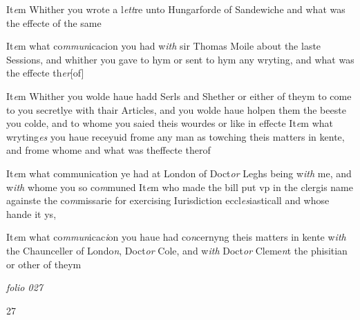 \documentclass[12pt, a4paper]{book}
\begin{document}
				\marginpar[\vspace{0.5cm}{\textcolor{Gray}{n}}]{}
			
		\ifthenelse{\isodd{\thepage}}
		{\reversemarginpar}
		{\normalmarginpar}
		It\textit{e}m Whither you wrote a l\textit{ett}re unto Hungarforde of Sandewiche and what was the effecte of the same 
            	
 	
				\marginpar[\vspace{0.5cm}{\textcolor{Gray}{n}}]{}
			
		\ifthenelse{\isodd{\thepage}}
		{\reversemarginpar}
		{\normalmarginpar}
		It\textit{e}m what co\textit{mmun}icacion you had w\textit{ith} sir Thomas Moile about the laste Sessions, and whither you gave to hym or sent to hym any wryting, and what was the effecte th\textit{er}[of]
 	
		\ifthenelse{\isodd{\thepage}}
		{\reversemarginpar}
		{\normalmarginpar}
		It\textit{e}m Whither you wolde haue hadd Serls and Shether or either of theym to come to you secretlye with thair Articles, and you wolde haue holpen them the beeste you colde, and to whome you saied theis wourdes or like in effecte It\textit{e}m what wryting\textit{es} you haue receyuid frome any man as towching theis matters in kente, and frome whome and what was theffecte therof
 	
		\ifthenelse{\isodd{\thepage}}
		{\reversemarginpar}
		{\normalmarginpar}
		It\textit{e}m what communication ye had at London of Doct\textit{or} Leghs being w\textit{ith} me, and w\textit{ith} whome you so co\textit{m}muned It\textit{e}m who made the bill put vp in the clergis name againste the co\textit{m}missarie for exercising Iurisdiction eccl\textit{es}iasticall and whose hande it ys,
 	
		\ifthenelse{\isodd{\thepage}}
		{\reversemarginpar}
		{\normalmarginpar}
		It\textit{e}m what co\textit{mmun}icac\textit{i}on you haue had co\textit{n}cernyng theis matters in kente w\textit{ith} the Chaunceller of Londo\textit{n}, Doct\textit{or} Cole, and w\textit{ith} Doct\textit{or} Cleme\textit{n}t the phisitian or other of theym

\dotfill
						\newpage
{}

\textit{folio 027}
         	\vspace*{4cm}

\begin{flushright}{\color{Mahogany}27}\end{flushright}

\dotfill
						
\end{document}
